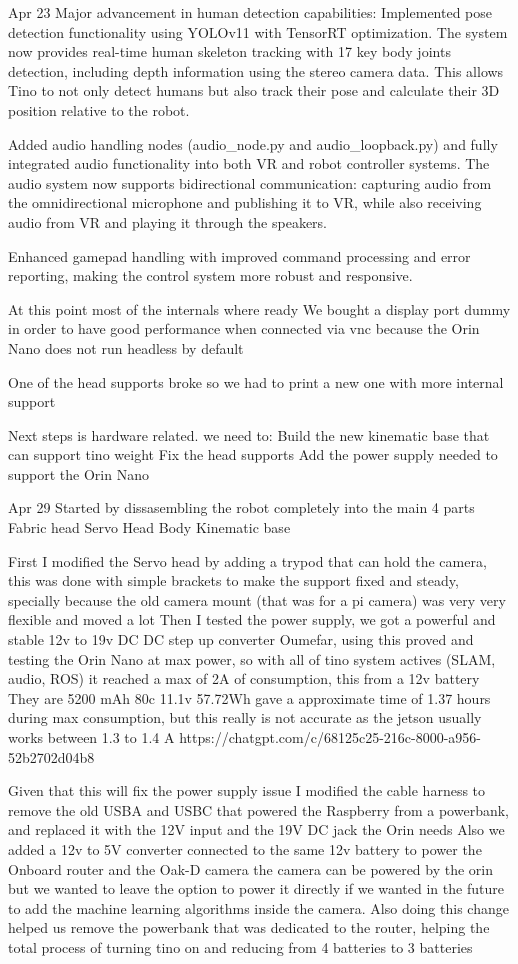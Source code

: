 Apr 23
Major advancement in human detection capabilities: Implemented pose detection functionality using YOLOv11 with TensorRT optimization. The system now provides real-time human skeleton tracking with 17 key body joints detection, including depth information using the stereo camera data. This allows Tino to not only detect humans but also track their pose and calculate their 3D position relative to the robot.

Added audio handling nodes (audio\_node.py and audio\_loopback.py) and fully integrated audio functionality into both VR and robot controller systems. The audio system now supports bidirectional communication: capturing audio from the omnidirectional microphone and publishing it to VR, while also receiving audio from VR and playing it through the speakers.

Enhanced gamepad handling with improved command processing and error reporting, making the control system more robust and responsive.

At this point most of the internals where ready
We bought a display port dummy in order to have good performance when connected via vnc because the Orin Nano does not run headless by default

One of the head supports broke so we had to print a new one with more internal support

Next steps is hardware related. we need to:
Build the new kinematic base that can support tino weight
Fix the head supports
Add the power supply needed to support the Orin Nano


Apr 29
Started by dissasembling the robot completely into the main 4 parts
Fabric head
Servo Head
Body
Kinematic base

First I modified the Servo head by adding a trypod that can hold the camera, this was done with simple brackets to make the support fixed and steady, specially because the old camera mount (that was for a pi camera) was very very flexible and moved a lot
Then I tested the power supply, we got a powerful and stable 12v to 19v DC DC step up converter Oumefar, using this proved and testing the Orin Nano at max power, so with all of tino system actives (SLAM, audio, ROS) it reached a max of 2A of consumption, this from a 12v battery They are 5200 mAh 80c 11.1v 57.72Wh gave a approximate time of 1.37 hours during max consumption, but this really is not accurate as the jetson usually works between 1.3 to 1.4 A
https://chatgpt.com/c/68125c25-216c-8000-a956-52b2702d04b8

Given that this will fix the power supply issue I modified the cable harness to remove the old USBA and USBC that powered the Raspberry from a powerbank, and replaced it with the 12V input and the 19V DC jack the Orin needs
Also we added a 12v to 5V converter connected to the same 12v battery to power the Onboard router and the Oak-D camera
the camera can be powered by the orin but we wanted to leave the option to power it directly if we wanted in the future to add the machine learning algorithms inside the camera.
Also doing this change helped us remove the powerbank that was dedicated to the router, helping the total process of turning tino on and reducing from 4 batteries to 3 batteries


